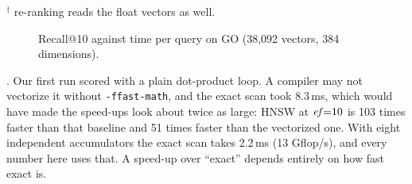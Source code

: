 \begin{table}[t]
\caption{Vector indexes on GO (recall@10, mean time per query, memory of the structure, build time).}
\label{tab-knn}
\small
{}

\smallskip
{\footnotesize $^\dagger$ re-ranking reads the float vectors as well.}
\end{table}

\begin{figure}[t]
\centering

\caption{Recall@10 against time per query on GO (38,092 vectors, 384 dimensions).}
\label{fig-knn}
\end{figure}

.
Our first run scored with a plain dot-product loop.
A compiler may not vectorize it without \texttt{-ffast-math}, and the exact
scan took 8.3\,ms, which would have made the speed-ups look about twice as
large: HNSW at $\mathit{ef}{=}10$ is 103 times faster than that baseline and 51 times
faster than the vectorized one.
With eight independent accumulators the exact scan takes 2.2\,ms (13
Gflop/s), and every number here uses that.
A speed-up over ``exact'' depends entirely on how fast exact is.

